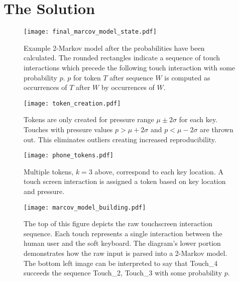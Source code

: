 \section{The Solution}
\label{the_solution}

\begin{figure}
\centering
\texttt{[image: final\_marcov\_model\_state.pdf]}
\caption{
Example 2-Markov model after the probabilities have been calculated.
The rounded rectangles indicate 
a sequence of touch interactions 
which precede the following touch interaction with some probability $p$.
$p$ for token $T$ after sequence $W$ is computed 
as occurrences of $T$ after $W$
by occurrences of $W$.
}
\label{fig:final_markov_model_state}
\end{figure}

\begin{figure}
\centering
\texttt{[image: token\_creation.pdf]}
\caption{
Tokens are only created for 
pressure range $\mu \pm 2\sigma$ 
for each key.
Touches with pressure values
$p>\mu + 2\sigma$ and $p<\mu - 2\sigma$
are thrown out.
This eliminates outliers creating
increased reproducibility.
}
\label{fig:token_creation}
\end{figure}

\begin{figure}
\centering
\texttt{[image: phone\_tokens.pdf]}
\caption{
Multiple tokens, $k=3$ above, correspond to each key location.
A touch screen interaction is assigned a token based on
key location and pressure.
}
\label{fig:phone_tokens}
\end{figure}

\begin{figure}
\centering
\texttt{[image: marcov\_model\_building.pdf]}
\caption{
The top of this figure depicts the raw touchscreen interaction sequence.
Each touch represents a single interaction between the human user and the soft keyboard.
The diagram's lower portion demonstrates how the raw input is parsed into a 2-Markov model.
The bottom left image can be interpreted to say that Touch\_4 succeeds the sequence Touch\_2, Touch\_3 with some probability $p$.
}
\label{fig:markov_model_building}
\end{figure}

